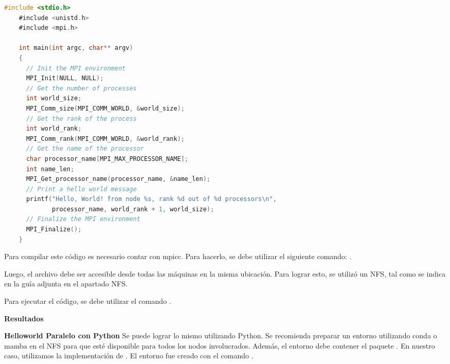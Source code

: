 \begin{spacing}{1.5}

  \begin{lstlisting}[language=C]
    #include <stdio.h>
    #include <unistd.h>
    #include <mpi.h>
    
    int main(int argc, char** argv)
    {
      // Init the MPI environment
      MPI_Init(NULL, NULL);
      // Get the number of processes
      int world_size;
      MPI_Comm_size(MPI_COMM_WORLD, &world_size);
      // Get the rank of the process
      int world_rank;
      MPI_Comm_rank(MPI_COMM_WORLD, &world_rank);
      // Get the name of the processor
      char processor_name[MPI_MAX_PROCESSOR_NAME];
      int name_len;
      MPI_Get_processor_name(processor_name, &name_len);
      // Print a hello world message
      printf("Hello, World! from node %s, rank %d out of %d processors\n",
             processor_name, world_rank + 1, world_size);
      // Finalize the MPI environment
      MPI_Finalize();
    }
    \end{lstlisting}

  Para compilar este código es necesario contar con mpicc. Para hacerlo, se
  debe utilizar el siguiente comando: .

  Luego, el archivo debe ser accesible desde todas las máquinas en la misma
  ubicación. Para lograr esto, se utilizó un NFS, tal como se indica en la guía
  adjunta en el apartado NFS.

  Para ejecutar el código, se debe utilizar el comando .

  \textbf{Resultados}

  \textbf{Helloworld Paralelo con Python}
  Se puede lograr lo mismo utilizando Python. Se recomienda preparar un
  entorno utilizando conda o mamba en el NFS para que esté disponible para
  todos
  los nodos involucrados. Además, el entorno debe contener el paquete
  . En nuestro caso, utilizamos la implementación de .
  El entorno fue creado con el comando .


\end{spacing}
